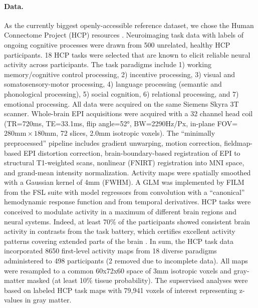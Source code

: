 \documentclass{article} %
\begin{document}
\paragraph{Data.}
As the currently biggest openly-accessible reference dataset,
we chose the Human Connectome Project (HCP) resources
\cite{barch2013}.
Neuroimaging task data with labels of ongoing cognitive processes
were drawn from 500 unrelated,
healthy HCP participants.
18 HCP tasks 
were selected that are known to elicit reliable neural activity
across participants.
The task paradigms include
1) working memory/cognitive control processing, 2)
incentive processing, 3) visual and somatosensory-motor processing,
4) language processing (semantic and phonological processing),
5) social cognition, 6) relational processing, and 7) emotional
processing. All data were acquired on the same Siemens Skyra 3T scanner.
Whole-brain EPI acquisitions were acquired with a
32 channel head coil (TR=720ms, TE=33.1ms, flip angle=52°, BW=2290Hz/Px,
in-plane FOV=$280\textrm{mm}\times180\textrm{mm}$, 72 slices, 2.0mm 
isotropic voxels).
The ``minimally preprocessed'' pipeline includes
gradient unwarping, motion correction, fieldmap-based EPI distortion
correction, brain-boundary-based registration of EPI to structural
T1-weighted scans, nonlinear (FNIRT) registration into MNI space,
and grand-mean intensity normalization. Activity maps were spatially
smoothed with a Gaussian kernel of 4mm (FWHM). A GLM was
implemented by FILM from the FSL suite with model regressors from convolution
with a “canonical” hemodynamic response function and from temporal derivatives.
HCP tasks were conceived to modulate activity
in a maximum of different brain regions and neural systems. Indeed, at
least 70\% of the participants showed consistent brain activity in
contrasts from the task battery, which certifies excellent
activity patterns covering extended parts of the brain \cite{barch2013}.
%
In sum, the HCP task data incorporated 8650 first-level activity maps
from 18 diverse paradigms administered to 498 participants (2 removed
due to incomplete data).
All maps were resampled to a common 60x72x60 space of
3mm isotropic voxels and gray-matter masked (at least 10\% tissue
probability).
The supservised analyses were based on labeled HCP task maps with
79,941 voxels of interest representing z-values in gray matter.
\end{document}

